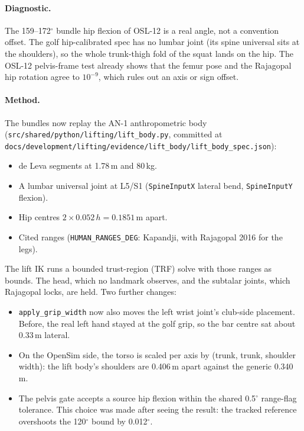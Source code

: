 \documentclass[11pt,a4paper]{article}
\begin{document}
\paragraph{Diagnostic.} The 159--172$^\circ$ bundle hip flexion of OSL-12 is a
real angle, not a convention offset. The golf hip-calibrated spec has no
lumbar joint (its spine universal sits at the shoulders), so the whole
trunk-thigh fold of the squat lands on the hip. The OSL-12 pelvis-frame test
already shows that the femur pose and the Rajagopal hip rotation agree to
$10^{-9}$, which rules out an axis or sign offset.

\paragraph{Method.} The bundles now replay the AN-1 anthropometric body
(\texttt{src/shared/python/lifting/lift\_body.py}, committed at
\texttt{docs/development/lifting/evidence/lift\_body/lift\_body\_spec.json}):
\begin{itemize}[nosep]
\item de Leva segments at 1.78\,m and 80\,kg.
\item A lumbar universal joint at L5/S1 (\texttt{SpineInputX} lateral bend,
  \texttt{SpineInputY} flexion).
\item Hip centres $2\times0.052\,h = 0.1851$\,m apart.
\item Cited ranges (\texttt{HUMAN\_RANGES\_DEG}: Kapandji, with Rajagopal 2016
  for the legs).
\end{itemize}
The lift IK runs a bounded trust-region (TRF) solve with those ranges as
bounds. The head, which no landmark observes, and the subtalar joints, which
Rajagopal locks, are held. Two further changes:
\begin{itemize}[nosep]
\item \texttt{apply\_grip\_width} now also moves the left wrist joint's
  club-side placement. Before, the real left hand stayed at the golf grip, so
  the bar centre sat about 0.33\,m lateral.
\item On the OpenSim side, the torso is scaled per axis by
  (trunk, trunk, shoulder width): the lift body's shoulders are 0.406\,m apart
  against the generic 0.340\,m.
\item The pelvis gate accepts a source hip flexion within the shared 0.5$^\circ$
  range-flag tolerance. This choice was made after seeing the result: the
  tracked reference overshoots the 120$^\circ$ bound by 0.012$^\circ$.
\end{itemize}
\end{document}
